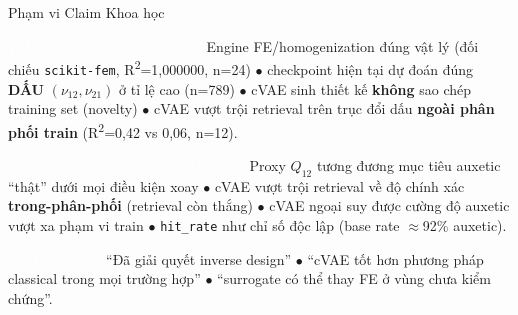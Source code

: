 \documentclass[aspectratio=169,11pt]{beamer}
\begin{document}
\begin{frame}{Phạm vi Claim Khoa học}
  \small
  \begin{block}{\textcolor{white}{$\checkmark$ Được ủng hộ bởi bằng chứng}}
    Engine FE/homogenization đúng vật lý (đối chiếu \texttt{scikit-fem}, R\textsuperscript{2}=1,000000, n=24) $\bullet$ checkpoint hiện tại dự đoán đúng \textbf{DẤU} $(\nu_{12},\nu_{21})$ ở tỉ lệ cao (n=789) $\bullet$ cVAE sinh thiết kế \textbf{không} sao chép training set (novelty) $\bullet$ cVAE vượt trội retrieval trên trục đổi dấu \textbf{ngoài phân phối train} (R\textsuperscript{2}=0,42 vs 0,06, n=12).
  \end{block}
  \begin{alertblock}{\textcolor{white}{$\sim$ Chưa được ủng hộ (dù có thể đúng)}}
    Proxy $Q_{12}$ tương đương mục tiêu auxetic ``thật'' dưới mọi điều kiện xoay $\bullet$ cVAE vượt trội retrieval về độ chính xác \textbf{trong-phân-phối} (retrieval còn thắng) $\bullet$ cVAE ngoại suy được cường độ auxetic vượt xa phạm vi train $\bullet$ \texttt{hit\_rate} như chỉ số độc lập (base rate $\approx$92\% auxetic).
  \end{alertblock}
  \begin{block}{\textcolor{white}{$\times$ Không claim}}
    ``Đã giải quyết inverse design'' $\bullet$ ``cVAE tốt hơn phương pháp classical trong mọi trường hợp'' $\bullet$ ``surrogate có thể thay FE ở vùng chưa kiểm chứng''.
  \end{block}
\end{frame}
\end{document}
